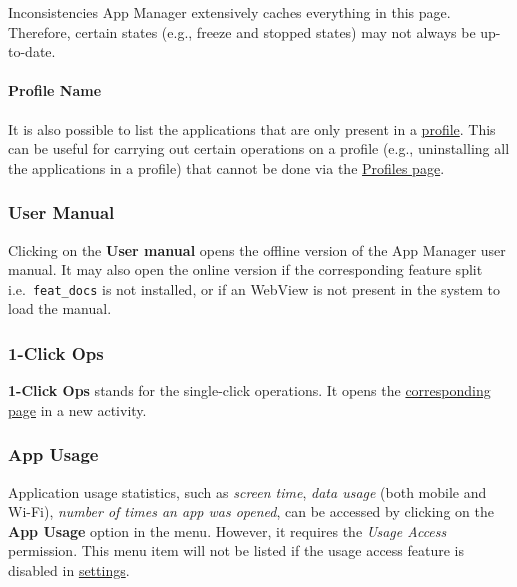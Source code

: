 \begin{warning}{Inconsistencies}
    App Manager extensively caches everything in this page. Therefore, certain states (e.g., freeze
    and stopped states) may not always be up-to-date.
\end{warning}

\paragraph{Profile Name}%
It is also possible to list the applications that are only present in a \hyperref[sec:profiles-page]{profile}. This can
be useful for carrying out certain operations on a profile (e.g., uninstalling all the applications in a profile) that
cannot be done via the \hyperref[sec:profiles-page]{Profiles page}.

\subsubsection{User Manual} %
Clicking on the \textbf{User manual} opens the offline version of the App Manager user manual. It may also open the
online version if the corresponding feature split i.e.\ \texttt{feat\_docs} is not installed, or if an WebView is not
present in the system to load the manual.

\subsubsection{1-Click Ops}\label{subsubsec:main:1-click-ops} %
\textbf{1-Click Ops} stands for the single-click operations. It opens the \hyperref[sec:1-click-ops-page]{corresponding
page} in a new activity.

\subsubsection{App Usage} %
Application usage statistics, such as \textit{screen time}, \textit{data usage} (both mobile and
Wi-Fi), \textit{number of times an app was opened}, can be accessed by clicking on the \textbf{App
Usage} option in the menu. However, it requires the \textit{Usage Access} permission. This menu item
will not be listed if the usage access feature is disabled in \hyperref[subsubsec:enable/disable-features]{settings}.

